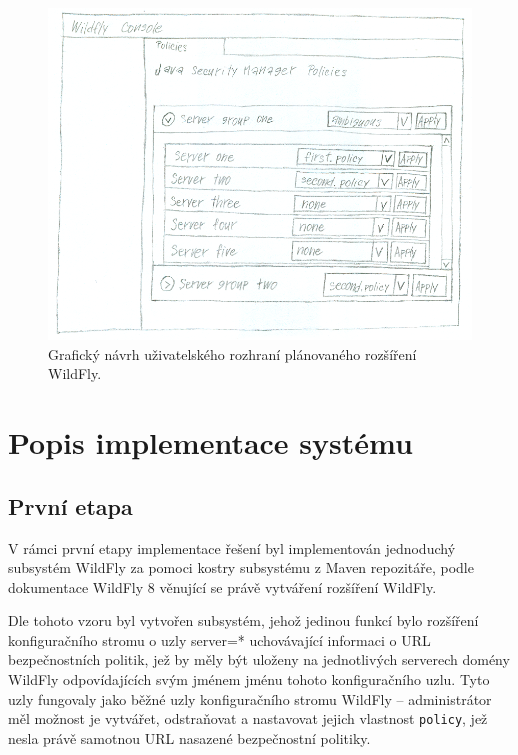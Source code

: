 \begin{figure}[ht]
  \centering
  \includegraphics[width=14cm]{fig/mockup}
  \caption{Grafický návrh uživatelského rozhraní plánovaného rozšíření WildFly.}
\end{figure}

\chapter{Popis implementace systému} \label{implementace}

\section{První etapa}

V rámci první etapy implementace řešení byl implementován jednoduchý subsystém WildFly za pomoci kostry subsystému z Maven repozitáře, podle dokumentace WildFly 8 věnující se právě vytváření rozšíření WildFly. \cite{WildFlyExtending}

Dle tohoto vzoru byl vytvořen subsystém, jehož jedinou funkcí bylo rozšíření konfiguračního stromu o uzly server=* uchovávající informaci o URL bezpečnostních politik, jež by měly být uloženy na jednotlivých serverech domény WildFly odpovídajících svým jménem jménu tohoto konfiguračního uzlu. Tyto uzly fungovaly jako běžné uzly konfiguračního stromu WildFly -- administrátor měl možnost je vytvářet, odstraňovat a nastavovat jejich vlastnost {\tt policy}, jež nesla právě samotnou URL nasazené bezpečnostní politiky.

